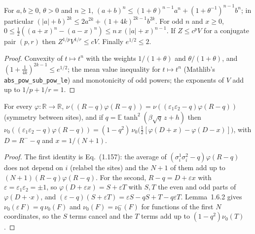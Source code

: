 \begin{lemma}
\label{lem:sg-tal:add-pow-estimates}
  \leanok
{}
For $a,b\ge0$, $\theta>0$ and $n\ge1$, $(a+b)^n\le(1+\theta)^{n-1}a^n+(1+\theta^{-1})^{n-1}b^n$; in particular
$(|a|+b)^{2k}\le2a^{2k}+(1+4k)^{2k-1}b^{2k}$. For odd $n$ and $x\ge0$, $0\le\frac12((a+x)^n-(a-x)^n)\le
n\,x\,(|a|+x)^{n-1}$. If $Z\le c^pV$ for a conjugate pair $(p,r)$ then $Z^{1/p}V^{1/r}\le cV$. Finally $e^{1/2}\le2$.
\end{lemma}
\begin{proof}
  \leanok
Convexity of $t\mapsto t^n$ with the weights $1/(1+\theta)$ and $\theta/(1+\theta)$, and $(1+\frac1{4k})^{2k-1}\le e^{1/2}$;
the mean value inequality for $t\mapsto t^n$ (Mathlib's \texttt{abs\_pow\_sub\_pow\_le}) and monotonicity of odd
powers; the exponents of $V$ add up to $1/p+1/r=1$.
\end{proof}

\begin{theorem}
\label{thm:sg-tal:overlap-odd-part}
  \leanok
{}
For every $\varphi:\mathbb R\to\mathbb R$, $\nu((R-q)\varphi(R-q))=\nu((\varepsilon_1\varepsilon_2-q)\varphi(R-q))$
(symmetry between sites), and if $q=\mathbb E\tanh^2(\beta\sqrt q\,z+h)$ then
$\nu_0((\varepsilon_1\varepsilon_2-q)\varphi(R-q))=(1-q^2)\,\nu_0\bigl(\tfrac12[\varphi(D+x)-\varphi(D-x)]\bigr)$,
with $D=R^--q$ and $x=1/(N+1)$.
\end{theorem}
\begin{proof}
  \leanok
The first identity is Eq.~(1.157): the average of $(\sigma^1_i\sigma^2_i-q)\varphi(R-q)$ does not depend on $i$
(relabel the sites) and the $N+1$ of them add up to $(N+1)(R-q)\varphi(R-q)$. For the second, $R-q=D+\varepsilon x$ with
$\varepsilon=\varepsilon_1\varepsilon_2=\pm1$, so $\varphi(D+\varepsilon x)=S+\varepsilon T$ with $S,T$ the even and odd
parts of $\varphi(D+\cdot x)$, and $(\varepsilon-q)(S+\varepsilon T)=\varepsilon S-qS+T-q\varepsilon T$. Lemma~1.6.2 gives
$\nu_0(\varepsilon\,F)=q\,\nu_0(F)$ and $\nu_0(F)=\nu_0^-(F)$ for functions of the first $N$ coordinates, so the $S$
terms cancel and the $T$ terms add up to $(1-q^2)\nu_0(T)$.
\end{proof}

